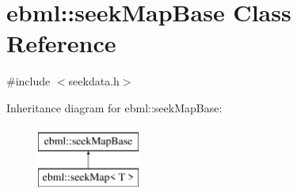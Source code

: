 \hypertarget{classebml_1_1seekMapBase}{}\section{ebml\+:\+:seek\+Map\+Base Class Reference}
\label{classebml_1_1seekMapBase}


{\ttfamily \#include $<$seekdata.\+h$>$}

Inheritance diagram for ebml\+:\+:seek\+Map\+Base\+:\begin{figure}[H]
\begin{center}
\leavevmode
\includegraphics[height=2.000000cm]{classebml_1_1seekMapBase}
\end{center}
\end{figure}
